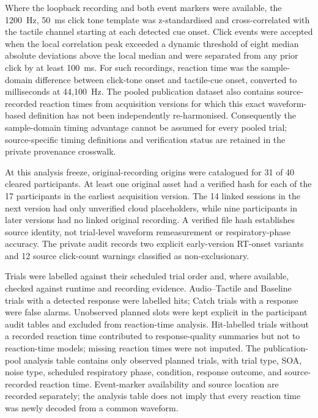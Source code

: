 Where the loopback recording and both event markers were available, the 1200~Hz, 50~ms click tone template was z-standardised and cross-correlated with the tactile channel starting at each detected cue onset. Click events were accepted when the local correlation peak exceeded a dynamic threshold of eight median absolute deviations above the local median and were separated from any prior click by at least 100~ms. For such recordings, reaction time was the sample-domain difference between click-tone onset and tactile-cue onset, converted to milliseconds at 44{,}100~Hz. The pooled publication dataset also contains source-recorded reaction times from acquisition versions for which this exact waveform-based definition has not been independently re-harmonised. Consequently the sample-domain timing advantage cannot be assumed for every pooled trial; source-specific timing definitions and verification status are retained in the private provenance crosswalk.

At this analysis freeze, original-recording origins were catalogued for 31 of 40 cleared participants. At least one original asset had a verified hash for each of the 17 participants in the earliest acquisition version. The 14 linked sessions in the next version had only unverified cloud placeholders, while nine participants in later versions had no linked original recording. A verified file hash establishes source identity, not trial-level waveform remeasurement or respiratory-phase accuracy. The private audit records two explicit early-version RT-onset variants and 12 source click-count warnings classified as non-exclusionary.

Trials were labelled against their scheduled trial order and, where available, checked against runtime and recording evidence. Audio--Tactile and Baseline trials with a detected response were labelled hits; Catch trials with a response were false alarms. Unobserved planned slots were kept explicit in the participant audit tables and excluded from reaction-time analysis. Hit-labelled trials without a recorded reaction time contributed to response-quality summaries but not to reaction-time models; missing reaction times were not imputed. The publication-pool analysis table contains only observed planned trials, with trial type, SOA, noise type, scheduled respiratory phase, condition, response outcome, and source-recorded reaction time. Event-marker availability and source location are recorded separately; the analysis table does not imply that every reaction time was newly decoded from a common waveform.


